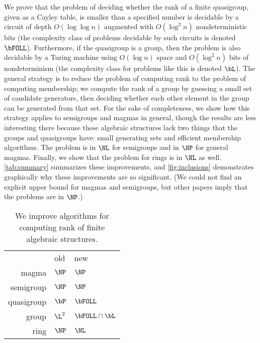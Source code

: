 \documentclass{article}
\begin{document}
%
We prove that the problem of deciding whether the rank of a finite quasigroup, given as a Cayley table, is smaller than a specified number is decidable by a circuit of depth $O(\log \log n)$ augmented with $O(\log^2 n)$ nondeterministic bits (the complexity class of problems decidable by such circuits is denoted $\bFOLL$).
Furthermore, if the quasigroup is a group, then the problem is also decidable by a Turing machine using $O(\log n)$ space and $O(\log^2 n)$ bits of nondeterminism (the complexity class for problems like this is denoted $\bL$).
The general strategy is to reduce the problem of computing rank to the problem of computing membership; we compute the rank of a group by guessing a small set of candidate generators, then deciding whether each other element in the group can be generated from that set.
For the sake of completeness, we show how this strategy applies to semigroups and magmas in general, though the results are less interesting there because these algebraic structures lack two things that the groups and quasigroups have: small generating sets and efficient membership algorithms.
The problem is in $\NL$ for semigroups and in $\NP$ for general magmas.
Finally, we show that the problem for rings is in $\NL$ as well.
\autoref{tab:summary} summarizes these improvements, and \autoref{fig:inclusions} demonstrates graphically why these improvements are so significant.
(We could not find an explicit upper bound for magmas and semigroups, but other papers imply that the problems are in $\NP$.)
\begin{table}
  \caption{\label{tab:summary}We improve algorithms for computing rank of finite algebraic structures.}
  \begin{center}
    \begin{tabular}{r l l}
      & old & new \\[5pt]
      magma & $\NP$ & $\NP$ \\
      semigroup & $\NP$ & $\NP$ \\
      quasigroup & $\bP$ \autocite{py96} & $\bFOLL$ \\
      group & $\L^2$ \autocite{lsz77} & $\bFOLL \cap \bL$ \\
      ring & $\NP$ & $\NL$
    \end{tabular}
  \end{center}
\end{table}
\end{document}
